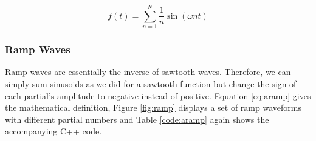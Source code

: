 \documentclass[12pt,twoside]{report}
\begin{document}
\begin{equation}
  f(t) = \sum\limits_{n=1}^N \frac{1}{n} \sin(\omega n t)
  \label{eq:asaw}
\end{equation}

\begin{figure}[h!]

  \TopFloatBoxes

  \begin{floatrow}



  \end{floatrow}

\end{figure}

\pagebreak

\subsubsection{Ramp Waves}

Ramp waves are essentially the inverse of sawtooth waves. Therefore, we can simply sum sinusoids as we did for a sawtooth function but change the sign of each partial's amplitude to negative instead of positive. Equation \ref{eq:aramp} gives the mathematical definition, Figure \ref{fig:ramp} displays a set of ramp waveforms with different partial numbers and Table \ref{code:aramp} again shows the accompanying C++ code.
\end{document}
